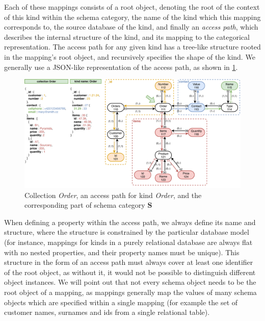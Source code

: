 Each of these mappings consists of a root object, denoting the root of the context of this kind within the schema category, the name of the kind which this mapping corresponds to, the source database of the kind, and finally an \textit{access path}, which describes the internal structure of the kind, and its mapping to the categorical representation.
The access path for any given kind has a tree-like structure rooted in the mapping's root object, and recursively specifies the shape of the kind.
We generally use a JSON-like representation of the access path, as shown in \cref{fig:mappings}.

\begin{figure}[ht]
\centering
\includegraphics[width=\textwidth]{img/fig_access-path-data.pdf} 
\caption{Collection \textit{Order}, an access path for kind \textit{Order}, and the corresponding part of schema category $\mathbf{S}$~\cite{unified_representation}}
\label{fig:mappings}
\end{figure}

When defining a property within the access path, we always define its name and structure, where the structure is constrained by the particular database model (for instance, mappings for kinds in a purely relational database are always flat with no nested properties, and their property names must be unique).
This structure in the form of an access path must always cover at least one identifier of the root object, as without it, it would not be possible to distinguish different object instances.
We will point out that not every schema object needs to be the root object of a mapping, as mappings generally map the values of many schema objects which are specified within a single mapping (for example the set of customer names, surnames and ids from a single relational table).

